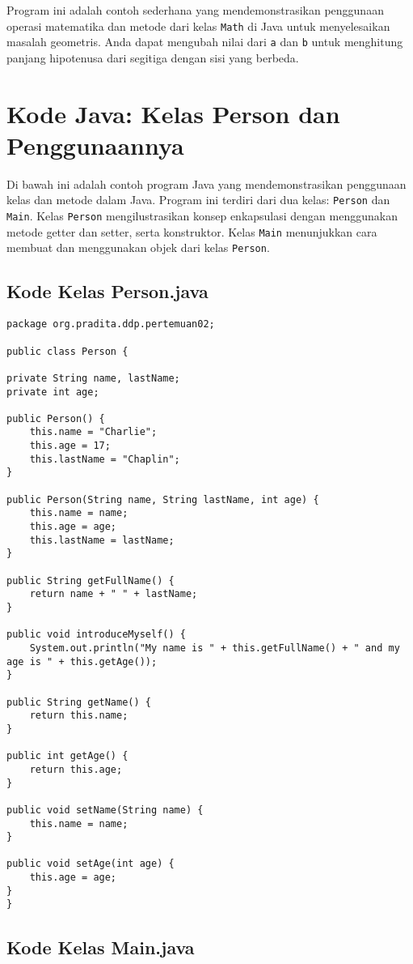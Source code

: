 Program ini adalah contoh sederhana yang mendemonstrasikan penggunaan operasi matematika dan metode dari kelas \texttt{Math} di Java untuk menyelesaikan masalah geometris. Anda dapat mengubah nilai dari \texttt{a} dan \texttt{b} untuk menghitung panjang hipotenusa dari segitiga dengan sisi yang berbeda.

\section{Kode Java: Kelas Person dan Penggunaannya}

Di bawah ini adalah contoh program Java yang mendemonstrasikan penggunaan kelas dan metode dalam Java. Program ini terdiri dari dua kelas: \texttt{Person} dan \texttt{Main}. Kelas \texttt{Person} mengilustrasikan konsep enkapsulasi dengan menggunakan metode getter dan setter, serta konstruktor. Kelas \texttt{Main} menunjukkan cara membuat dan menggunakan objek dari kelas \texttt{Person}.

\subsection{Kode Kelas Person.java}

\begin{lstlisting}[style=JavaStyle, caption={Kode Java: Person.java}]
package org.pradita.ddp.pertemuan02;

public class Person {

private String name, lastName;
private int age;

public Person() {
	this.name = "Charlie";
	this.age = 17;
	this.lastName = "Chaplin";
}

public Person(String name, String lastName, int age) {
	this.name = name;
	this.age = age;
	this.lastName = lastName;
}

public String getFullName() {
	return name + " " + lastName;
}

public void introduceMyself() {
	System.out.println("My name is " + this.getFullName() + " and my age is " + this.getAge());
}

public String getName() {
	return this.name;
}

public int getAge() {
	return this.age;
}

public void setName(String name) {
	this.name = name;
}

public void setAge(int age) {
	this.age = age;
}
}
\end{lstlisting}

\subsection{Kode Kelas Main.java}

